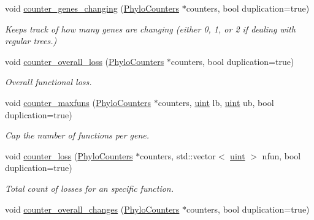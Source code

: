 \begin{Indent}
\begin{DoxyCompactItemize}
void \hyperlink{namespacebarry_1_1counters_1_1phylo_a680cd7516f66f06eb8a27d8b252b53ed}{counter\+\_\+genes\+\_\+changing} (\hyperlink{namespacebarry_1_1counters_1_1phylo_a4e401ffe66d04091343dcffaf915f8c3}{Phylo\+Counters} $\ast$counters, bool duplication=true)
\begin{DoxyCompactList}\small\item\em Keeps track of how many genes are changing (either 0, 1, or 2 if dealing with regular trees.) \end{DoxyCompactList}\item 
void \hyperlink{namespacebarry_1_1counters_1_1phylo_a79ccde09af0d3d47b1a3162a16bc4597}{counter\+\_\+overall\+\_\+loss} (\hyperlink{namespacebarry_1_1counters_1_1phylo_a4e401ffe66d04091343dcffaf915f8c3}{Phylo\+Counters} $\ast$counters, bool duplication=true)
\begin{DoxyCompactList}\small\item\em Overall functional loss. \end{DoxyCompactList}\item 
void \hyperlink{namespacebarry_1_1counters_1_1phylo_a80949b65fbe734d854742306065914bf}{counter\+\_\+maxfuns} (\hyperlink{namespacebarry_1_1counters_1_1phylo_a4e401ffe66d04091343dcffaf915f8c3}{Phylo\+Counters} $\ast$counters, \hyperlink{namespacebarry_a11dfc53ddb4672278319aa04f1e09a6c}{uint} lb, \hyperlink{namespacebarry_a11dfc53ddb4672278319aa04f1e09a6c}{uint} ub, bool duplication=true)
\begin{DoxyCompactList}\small\item\em Cap the number of functions per gene. \end{DoxyCompactList}\item 
void \hyperlink{namespacebarry_1_1counters_1_1phylo_affbd49d13928ece0a2f100261375d2a7}{counter\+\_\+loss} (\hyperlink{namespacebarry_1_1counters_1_1phylo_a4e401ffe66d04091343dcffaf915f8c3}{Phylo\+Counters} $\ast$counters, std\+::vector$<$ \hyperlink{namespacebarry_a11dfc53ddb4672278319aa04f1e09a6c}{uint} $>$ nfun, bool duplication=true)
\begin{DoxyCompactList}\small\item\em Total count of losses for an specific function. \end{DoxyCompactList}\item 
void \hyperlink{namespacebarry_1_1counters_1_1phylo_abeaaaa150b98e55f7bc242810fa1230a}{counter\+\_\+overall\+\_\+changes} (\hyperlink{namespacebarry_1_1counters_1_1phylo_a4e401ffe66d04091343dcffaf915f8c3}{Phylo\+Counters} $\ast$counters, bool duplication=true)

\end{DoxyCompactItemize}
\end{Indent}
